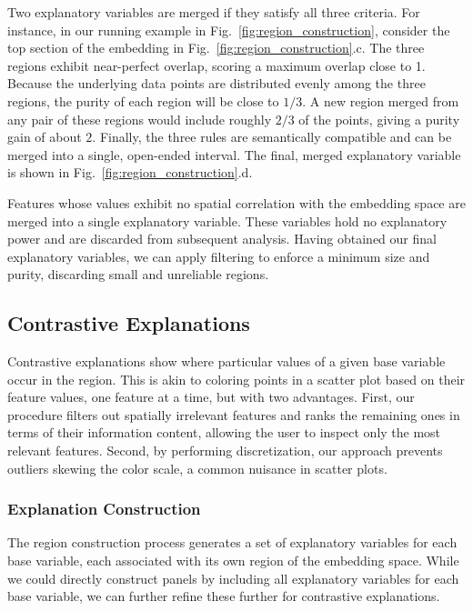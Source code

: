\documentclass[lettersize,journal]{IEEEtran}
\begin{document}
Two explanatory variables are merged if they satisfy all three criteria.
For instance, in our running example in Fig.~\ref{fig:region_construction}, consider the top section of the embedding in Fig.~\ref{fig:region_construction}.c. The three regions exhibit near-perfect overlap, scoring a maximum overlap close to 1. Because the underlying data points are distributed evenly among the three regions, the purity of each region will be close to $1/3$. A new region merged from any pair of these regions would include roughly $2/3$ of the points, giving a purity gain of about $2$. Finally, the three rules are semantically compatible and can be merged into a single, open-ended interval. The final, merged explanatory variable is shown in Fig.~\ref{fig:region_construction}.d.

Features whose values exhibit no spatial correlation with the embedding space are merged into a single explanatory variable. These variables hold no explanatory power and are discarded from subsequent analysis.
Having obtained our final explanatory variables, we can apply filtering to enforce a minimum size and purity, discarding small and unreliable regions.

\subsection{Contrastive Explanations}
\label{sec:contrastive}

Contrastive explanations show where particular values of a given base variable occur in the region. This is akin to coloring points in a scatter plot based on their feature values, one feature at a time, but with two advantages. First, our procedure filters out spatially irrelevant features and ranks the remaining ones in terms of their information content, allowing the user to inspect only the most relevant features. Second, by performing discretization, our approach prevents outliers skewing the color scale, a common nuisance in scatter plots.

\subsubsection{Explanation Construction}

The region construction process generates a set of explanatory variables for each base variable, each associated with its own region of the embedding space. While we could directly construct panels by including all explanatory variables for each base variable, we can further refine these further for contrastive explanations.
\end{document}
